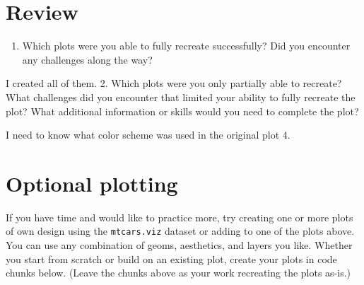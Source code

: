 \documentclass[
  man,
  floatsintext,
  longtable,
  nolmodern,
  notxfonts,
  notimes,
  colorlinks=true,linkcolor=blue,citecolor=blue,urlcolor=blue]{apa7}
\providecommand{\tightlist}{%
  \setlength{\itemsep}{0pt}\setlength{\parskip}{0pt}}
\begin{document}
\begin{figure}[H]

\caption{\label{fig-plot6-for-comparison}}


\end{figure}%

\section{Review}\label{review}

\begin{enumerate}
\def\labelenumi{\arabic{enumi}.}
\tightlist
\item
  Which plots were you able to fully recreate successfully? Did you
  encounter any challenges along the way?
\end{enumerate}

I created all of them. 2. Which plots were you only partially able to
recreate? What challenges did you encounter that limited your ability to
fully recreate the plot? What additional information or skills would you
need to complete the plot?

I need to know what color scheme was used in the original plot 4.

\section{Optional plotting}\label{optional-plotting}

If you have time and would like to practice more, try creating one or
more plots of own design using the \texttt{mtcars.viz} dataset or adding
to one of the plots above. You can use any combination of geoms,
aesthetics, and layers you like. Whether you start from scratch or build
on an existing plot, create your plots in code chunks below. (Leave the
chunks above as your work recreating the plots as-is.)
\end{document}
